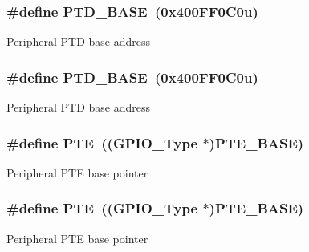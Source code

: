\subsubsection[{\texorpdfstring{P\+T\+D\+\_\+\+B\+A\+SE}{PTD_BASE}}]{\setlength{\rightskip}{0pt plus 5cm}\#define P\+T\+D\+\_\+\+B\+A\+SE~(0x400\+F\+F0\+C0u)}\hypertarget{group__GPIO__Peripheral__Access__Layer_gaa002f1a0c5f963f8d162916b91e21bf0}{}\label{group__GPIO__Peripheral__Access__Layer_gaa002f1a0c5f963f8d162916b91e21bf0}
Peripheral P\+TD base address 
\subsubsection[{\texorpdfstring{P\+T\+D\+\_\+\+B\+A\+SE}{PTD_BASE}}]{\setlength{\rightskip}{0pt plus 5cm}\#define P\+T\+D\+\_\+\+B\+A\+SE~(0x400\+F\+F0\+C0u)}\hypertarget{group__GPIO__Peripheral__Access__Layer_gaa002f1a0c5f963f8d162916b91e21bf0}{}\label{group__GPIO__Peripheral__Access__Layer_gaa002f1a0c5f963f8d162916b91e21bf0}
Peripheral P\+TD base address 
\subsubsection[{\texorpdfstring{P\+TE}{PTE}}]{\setlength{\rightskip}{0pt plus 5cm}\#define P\+TE~(({\bf G\+P\+I\+O\+\_\+\+Type} $\ast$){\bf P\+T\+E\+\_\+\+B\+A\+SE})}\hypertarget{group__GPIO__Peripheral__Access__Layer_ga074482d761e5bcd022a14aa7b8c294d7}{}\label{group__GPIO__Peripheral__Access__Layer_ga074482d761e5bcd022a14aa7b8c294d7}
Peripheral P\+TE base pointer 
\subsubsection[{\texorpdfstring{P\+TE}{PTE}}]{\setlength{\rightskip}{0pt plus 5cm}\#define P\+TE~(({\bf G\+P\+I\+O\+\_\+\+Type} $\ast$){\bf P\+T\+E\+\_\+\+B\+A\+SE})}\hypertarget{group__GPIO__Peripheral__Access__Layer_ga074482d761e5bcd022a14aa7b8c294d7}{}\label{group__GPIO__Peripheral__Access__Layer_ga074482d761e5bcd022a14aa7b8c294d7}
Peripheral P\+TE base pointer 
